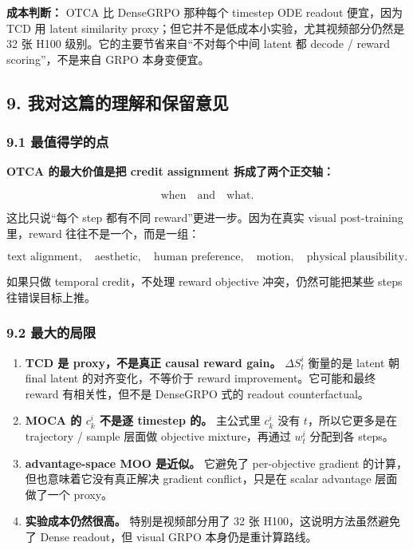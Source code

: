 \begin{warnbox}
\textbf{成本判断：} OTCA 比 DenseGRPO 那种每个 timestep ODE readout 便宜，因为 TCD 用 latent similarity proxy；但它并不是低成本小实验，尤其视频部分仍然是 32 张 H100 级别。它的主要节省来自“不对每个中间 latent 都 decode / reward scoring”，不是来自 GRPO 本身变便宜。
\end{warnbox}

\subsection{9. 我对这篇的理解和保留意见}

\subsubsection{9.1 最值得学的点}

\textbf{OTCA 的最大价值是把 credit assignment 拆成了两个正交轴：}

\[
\text{when}
\quad
\text{and}
\quad
\text{what}.
\]

这比只说“每个 step 都有不同 reward”更进一步。因为在真实 visual post-training 里，reward 往往不是一个，而是一组：

\[
\text{text alignment},\quad
\text{aesthetic},\quad
\text{human preference},\quad
\text{motion},\quad
\text{physical plausibility}.
\]

如果只做 temporal credit，不处理 reward objective 冲突，仍然可能把某些 steps 往错误目标上推。

\subsubsection{9.2 最大的局限}

\begin{enumerate}[leftmargin=1.5em]
  \item \textbf{TCD 是 proxy，不是真正 causal reward gain。} \(\Delta S_t^i\) 衡量的是 latent 朝 final latent 的对齐变化，不等价于 reward improvement。它可能和最终 reward 有相关性，但不是 DenseGRPO 式的 readout counterfactual。
  \item \textbf{MOCA 的 \(c_k^i\) 不是逐 timestep 的。} 主公式里 \(c_k^i\) 没有 \(t\)，所以它更多是在 trajectory / sample 层面做 objective mixture，再通过 \(w_t^i\) 分配到各 steps。
  \item \textbf{advantage-space MOO 是近似。} 它避免了 per-objective gradient 的计算，但也意味着它没有真正解决 gradient conflict，只是在 scalar advantage 层面做了一个 proxy。
  \item \textbf{实验成本仍然很高。} 特别是视频部分用了 32 张 H100，这说明方法虽然避免了 Dense readout，但 visual GRPO 本身仍是重计算路线。
\end{enumerate}

